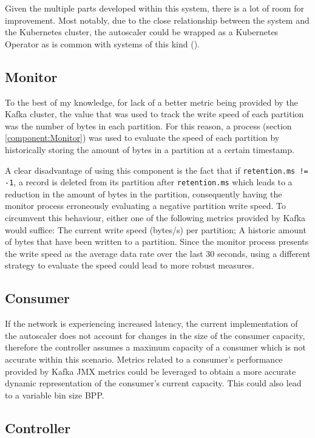 Given the multiple parts developed within this system, there is a lot of room
for improvement. Most notably, due to the close relationship between the system
and the Kubernetes cluster, the autoscaler could be wrapped as a Kubernetes
Operator \cite{KuberenetesOperator} as is common with systems of this kind
(\cite{Kubegres, PulumiOperator, KEDA}).

\subsection{Monitor}

To the best of my knowledge, for lack of a better metric being provided by the
Kafka cluster, the value that was used to track the write speed of each
partition was the number of bytes in each partition. For this reason, a process
(section \ref{component:Monitor}) was used to evaluate the speed of each partition by
historically storing the amount of bytes in a partition at a certain timestamp.

A clear disadvantage of using this component is the fact that if
\lstinline{retention.ms != -1}, a record is deleted from its partition after
\lstinline{retention.ms} which leads to a reduction in the amount of bytes in
the partition, consequently having the monitor process erroneously evaluating a
negative partition write speed. To circumvent this behaviour, either one of the
following metrics provided by Kafka would suffice: The current write speed
(bytes/s) per partition; A historic amount of bytes that have been written to a
partition. Since the monitor process presents the write speed as the average
data rate over the last 30 seconds, using a different strategy to evaluate the
speed could lead to more robust measures.

\subsection{Consumer}

If the network is experiencing increased latency, the current implementation of
the autoscaler does not account for changes in the size of the consumer
capacity, therefore the controller assumes a maximum capacity of a consumer
which is not accurate within this scenario. Metrics related to a consumer's
performance provided by Kafka JMX metrics could be leveraged to obtain a more
accurate dynamic representation of the consumer's current capacity. This could
also lead to a variable bin size BPP.

\subsection{Controller}

